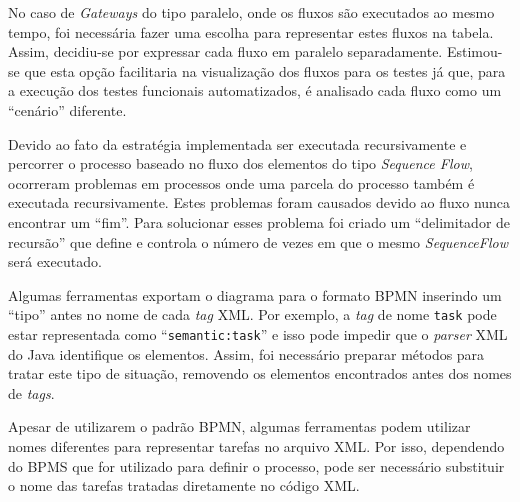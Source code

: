 \documentclass[12pt]{article}
\begin{document}
No caso de \emph{Gateways} do tipo paralelo, onde os fluxos são executados ao mesmo tempo, foi necessária fazer uma escolha para representar estes fluxos na tabela. Assim, decidiu-se por expressar cada fluxo em paralelo separadamente. Estimou-se que esta opção facilitaria na visualização dos fluxos para os testes já que, para a execução dos testes funcionais automatizados, é analisado cada fluxo como um ``cenário'' diferente.


Devido ao fato da estratégia implementada ser executada recursivamente e percorrer o processo baseado no fluxo dos elementos do tipo \emph{Sequence Flow}, ocorreram problemas em processos onde uma parcela do processo também é executada recursivamente. Estes problemas foram causados devido ao fluxo nunca encontrar um ``fim''. Para solucionar esses problema foi criado um ``delimitador de recursão'' que define e controla o número de vezes em que o mesmo \emph{SequenceFlow} será executado.

Algumas ferramentas exportam o diagrama para o formato BPMN inserindo um ``tipo'' antes no nome de cada \emph{tag} XML. Por exemplo, a \emph{tag} de nome \texttt{task} pode estar representada como ``\texttt{semantic:task}'' e isso pode impedir que o \emph{parser} XML do Java identifique os elementos. Assim, foi necessário preparar métodos para tratar este tipo de situação, removendo os elementos encontrados antes dos nomes de \emph{tags}.

Apesar de utilizarem o padrão BPMN, algumas ferramentas podem utilizar nomes diferentes para representar tarefas no arquivo XML. Por isso, dependendo do BPMS que for utilizado para definir o processo, pode ser necessário substituir o nome das tarefas tratadas diretamente no código XML.


\end{document}
